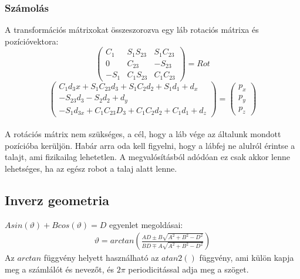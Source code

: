\documentclass{article}
\begin{document}
\subsubsection{Számolás}
A transformációs mátrixokat összeszorozva egy láb rotaciós mátrixa és pozícióvektora:
$$
\begin{pmatrix}
C_1&S_1S_{23}&S_1C_{23}\\
0&C_{23}&-S_{23}\\
-S_1&C_1S_{23}&C_1C_{23}
\end{pmatrix}
=
Rot
$$
$$
\begin{pmatrix}
C_1d_3x+S_1C_{23}d_3+S_1C_2d_2+S_1d_1+d_x\\
-S_{23}d_3-S_2d_2+d_y\\
-S_1d_{3x}+C_1C_{23}D_3+C_1C_2d_2+C_1d_1+d_z
\end{pmatrix}
=
\begin{pmatrix}
p_x\\
p_y\\
p_z
\end{pmatrix}
$$
\\
A rotációs mátrix nem szükséges, a cél, hogy a láb vége az általunk mondott pozícióba kerüljön. Habár arra oda kell figyelni, hogy a lábfej ne alulról érintse a talajt, ami fizikailag lehetetlen. A megvalósításból adódóan ez csak akkor lenne lehetséges, ha az egész robot a talaj alatt lenne.
	
\subsection{Inverz geometria}
$A sin(\vartheta)+B cos(\vartheta)=D$ egyenlet megoldásai:
\begin{align} \label{eq:trigeq}
\vartheta = arctan \left( \frac{A D\pm B\sqrt{A^2+B^2-D^2}}{B D\mp A\sqrt{A^2+B^2-D^2}} \right)
\end{align}
Az $arctan$ függvény helyett használható az $atan2()$ függvény, ami külön kapja meg a számlálót és nevezőt, és $2\pi$ periodicitással adja meg a szöget.
\end{document}
